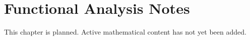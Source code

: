 
\section*{Functional Analysis Notes}
This chapter is planned. Active mathematical content has not yet been added.
